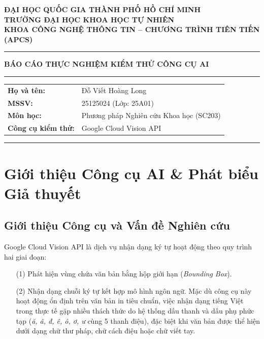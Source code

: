 \documentclass[11pt,a4paper]{article}
\begin{document}
\begin{center}
    {\large \textbf{ĐẠI HỌC QUỐC GIA THÀNH PHỐ HỒ CHÍ MINH}}\\[0.2em]
    {\large \textbf{TRƯỜNG ĐẠI HỌC KHOA HỌC TỰ NHIÊN}}\\[0.3em]
    {\normalsize \textbf{KHOA CÔNG NGHỆ THÔNG TIN -- CHƯƠNG TRÌNH TIÊN TIẾN (APCS)}}\\[1.0em]

    \hrule height 0.8pt
    \vspace{0.5em}
    {\Large \textbf{BÁO CÁO THỰC NGHIỆM KIỂM THỬ CÔNG CỤ AI}}\\[1.4em]
    \hrule height 0.8pt
\end{center}

\vspace{0.2em}
\begin{tabularx}{\textwidth}{@{}L{4cm}Y@{}}
    \textbf{Họ và tên:} & Đỗ Viết Hoàng Long \\
    \textbf{MSSV:} & 25125024 (Lớp: 25A01) \\
    \textbf{Môn học:} & Phương pháp Nghiên cứu Khoa học (SC203) \\
    \textbf{Công cụ kiểm thử:} & Google Cloud Vision API\\
\end{tabularx}
\vspace{0.2em}
\hrule
\vspace{0.5em}

\section{Giới thiệu Công cụ AI \& Phát biểu Giả thuyết}

\subsection{Giới thiệu Công cụ và Vấn đề Nghiên cứu}
Google Cloud Vision API là dịch vụ nhận dạng ký tự hoạt động theo quy trình hai giai đoạn: 

\begin{itemize}
	\item[(1)] Phát hiện vùng chứa văn bản bằng hộp giới hạn (\textit{Bounding Box}).
	\item [(2)] Nhận dạng chuỗi ký tự kết hợp mô hình ngôn ngữ. Mặc dù công cụ này hoạt động ổn định trên văn bản in tiêu chuẩn, việc nhận dạng tiếng Việt trong thực tế gặp nhiều thách thức do hệ thống dấu thanh và dấu phụ phức tạp (\textit{ă, â, đ, ê, ô, ơ, ư} cùng 5 thanh điệu), đặc biệt khi văn bản được thể hiện dưới dạng chữ thư pháp, chữ cách điệu hoặc chữ viết tay.
\end{itemize}
\end{document}
